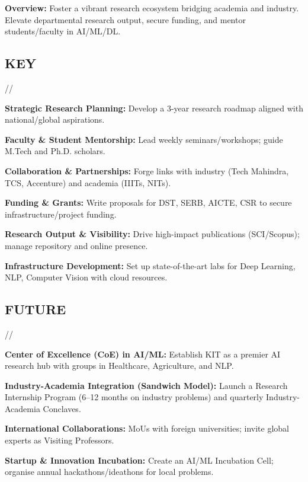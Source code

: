 \documentclass[]{deedy-resume-reversed}
\begin{document}
\vspace{\topsep}
\begin{tightemize}
    \item \textbf{Overview:} Foster a vibrant research ecosystem bridging academia and industry. Elevate departmental research output, secure funding, and mentor students/faculty in AI/ML/DL.
\end{tightemize}

\subsection*{KEY}//
\begin{tightemize}
    \item \textbf{Strategic Research Planning:} Develop a 3-year research roadmap aligned with national/global aspirations.
    \item \textbf{Faculty \& Student Mentorship:} Lead weekly seminars/workshops; guide M.Tech and Ph.D. scholars.
    \item \textbf{Collaboration \& Partnerships:} Forge links with industry (Tech Mahindra, TCS, Accenture) and academia (IIITs, NITs).
    \item \textbf{Funding \& Grants:} Write proposals for DST, SERB, AICTE, CSR to secure infrastructure/project funding.
    \item \textbf{Research Output \& Visibility:} Drive high-impact publications (SCI/Scopus); manage repository and online presence.
    \item \textbf{Infrastructure Development:} Set up state-of-the-art labs for Deep Learning, NLP, Computer Vision with cloud resources.
\end{tightemize}

\subsection*{FUTURE}//
\begin{tightemize}
    \item \textbf{Center of Excellence (CoE) in AI/ML:} Establish KIT as a premier AI research hub with groups in Healthcare, Agriculture, and NLP.
    \item \textbf{Industry-Academia Integration (Sandwich Model):} Launch a Research Internship Program (6–12 months on industry problems) and quarterly Industry-Academia Conclaves.
    \item \textbf{International Collaborations:} MoUs with foreign universities; invite global experts as Visiting Professors.
    \item \textbf{Startup \& Innovation Incubation:} Create an AI/ML Incubation Cell; organise annual hackathons/ideathons for local problems.
\end{tightemize}
\end{document}
